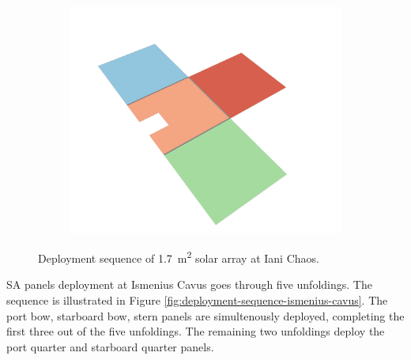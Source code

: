 \begin{figure}[h]
\begin{subfigure}[t]{\subfigureWidth}
		\label{fig:sub:deployment-sequence-iani-chaos-mid}
	\end{subfigure}\hfill
    \begin{subfigure}[t]{\subfigureWidth}
        \centering
		\includegraphics[height=\graphicsHeight]{sections/design/solar-array/images/deployment/iani-chaos/solar_array_deployment_iani_chaos_060.png}
		\label{fig:sub:deployment-sequence-iani-completed}
	\end{subfigure}
	\caption{Deployment sequence of \SI{1.7}{\meter\squared} solar array at Iani Chaos.}
	\label{fig:deployment-sequence-iani-chaos}
\vspace{-2ex}
\end{figure}

\vspace{0.5cm}

\ac{SA} panels deployment at Ismenius Cavus goes through five unfoldings. The sequence is illustrated in Figure \ref{fig:deployment-sequence-ismenius-cavus}. The port bow, starboard bow, stern panels are simultenously deployed, completing the first three out of the five unfoldings. The remaining two unfoldings deploy the port quarter and starboard quarter panels.

\vspace{0.5cm}

